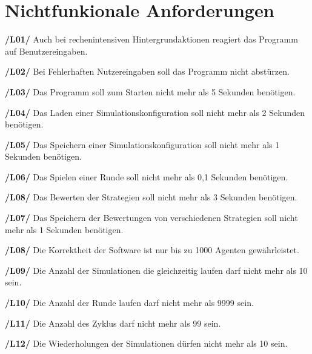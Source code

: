 \section{Nichtfunkionale Anforderungen}

\textbf{/L01/ }
Auch bei rechenintensiven Hintergrundaktionen reagiert das Programm auf Benutzereingaben.

\textbf{/L02/}
Bei Fehlerhaften Nutzereingaben soll das Programm nicht abstürzen.

\textbf{/L03/}
Das Programm soll zum Starten nicht mehr als 5 Sekunden benötigen.

\textbf{/L04/}
Das Laden einer Simulationskonfiguration soll nicht mehr als 2 Sekunden benötigen.

\textbf{/L05/}
Das Speichern einer Simulationskonfiguration soll nicht mehr als 1 Sekunden benötigen.

\textbf{/L06/}
Das Spielen einer Runde soll nicht mehr als 0,1 Sekunden benötigen.

\textbf{/L08/}
Das Bewerten der Strategien soll nicht mehr als 3 Sekunden benötigen.

\textbf{/L07/}
Das Speichern der Bewertungen von verschiedenen Strategien soll nicht mehr als 1 Sekunden benötigen.

\textbf{/L08/}
Die Korrektheit der Software ist nur bis zu 1000 Agenten gewährleistet.

\textbf{/L09/}
Die Anzahl der Simulationen die gleichzeitig laufen darf nicht mehr als 10 sein.

\textbf{/L10/}
Die Anzahl der Runde laufen darf nicht mehr als 9999 sein.

\textbf{/L11/}
Die Anzahl des Zyklus darf nicht mehr als 99 sein.

\textbf{/L12/}
Die Wiederholungen der Simulationen dürfen nicht mehr als 10 sein.